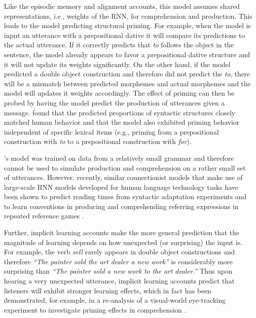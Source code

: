 Like the episodic memory and alignment accounts, this model assumes shared representations, i.e., weights of the RNN, for comprehension and production.
This leads to the model predicting structural priming. For example, when the model is input an utterance with a prepositional dative it will compare its predictions
to the actual utterance. If it correctly predicts that \textit{to} follows the object in the sentence, the model already appears to favor a prepositional dative structure and it will
not update its weights significantly. On the other hand, if the model predicted a double object construction and therefore did not predict the \textit{to}, there will be a mismatch
between predicted morphemes and actual morphemes and the model will updates it weights accordingly. The effect of priming can then be probed by having the model predict
the production of utterances given a message. \textcite{Chang2006} found that the predicted proportions of syntactic structures closely matched human behavior and that the model
also exhibited priming behavior independent of specific lexical items (e.g., priming from a prepositional construction with \textit{to} to a prepositional construction with \textit{for}).

\citeauthor{Chang2006}'s model was trained on data from a relatively small grammar and therefore cannot be used to simulate production and comprehension on a rather small set
of utterances. However, recently, similar connectionist models that make use of large-scale RNN models developed for human language technology 
tasks have been shown to predict reading times from syntactic adaptation experiments \cite{VanSchijndel2018} and to learn conventions in producing and comprehending 
referring expressions in repeated reference games \cite{Hawkins2019}. 

Further, implicit learning accounts make the more general prediction that the magnitude of learning depends on how unexpected (or surprising) the input is. For example, the verb \textit{sell} 
rarely appears in  double object constructions and therefore \textit{``The painter sold the art dealer a new work''} is considerably more surprising than \textit{``The painter sold  a new work to 
the art dealer.''} Thus upon hearing a very unexpected utterance, implicit learning accounts predict that listeners will exhibit stronger learning effects, which in fact has been demonstrated, 
for example, in a re-analysis of a visual-world eye-tracking experiment to investigate priming effects in comprehension \cite{Thothathiri2008,Jaeger2013}. 

